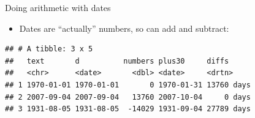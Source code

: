 \documentclass[ignorenonframetext,]{beamer}
\newenvironment{Shaded}{\begin{snugshade}}{\end{snugshade}}
\newcommand{\DataTypeTok}[1]{\textcolor[rgb]{0.13,0.29,0.53}{#1}}
\newcommand{\DecValTok}[1]{\textcolor[rgb]{0.00,0.00,0.81}{#1}}
\newcommand{\KeywordTok}[1]{\textcolor[rgb]{0.13,0.29,0.53}{\textbf{#1}}}
\newcommand{\NormalTok}[1]{#1}
\newcommand{\OperatorTok}[1]{\textcolor[rgb]{0.81,0.36,0.00}{\textbf{#1}}}
\newcommand{\StringTok}[1]{\textcolor[rgb]{0.31,0.60,0.02}{#1}}
\providecommand{\tightlist}{%
  \setlength{\itemsep}{0pt}\setlength{\parskip}{0pt}}
\begin{document}
\begin{frame}[fragile]{Doing arithmetic with dates}
\protect\hypertarget{doing-arithmetic-with-dates}{}

\begin{itemize}
\tightlist
\item
  Dates are ``actually'' numbers, so can add and subtract:
\end{itemize}

\begin{Shaded}
\end{Shaded}

\begin{verbatim}
## # A tibble: 3 x 5
##   text       d          numbers plus30     diffs     
##   <chr>      <date>       <dbl> <date>     <drtn>    
## 1 1970-01-01 1970-01-01       0 1970-01-31 13760 days
## 2 2007-09-04 2007-09-04   13760 2007-10-04     0 days
## 3 1931-08-05 1931-08-05  -14029 1931-09-04 27789 days
\end{verbatim}

\end{frame}
\end{document}
